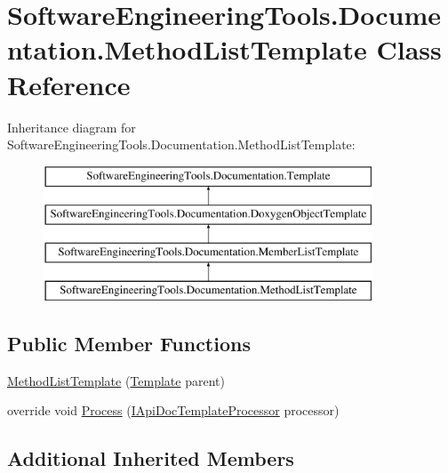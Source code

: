 \hypertarget{class_software_engineering_tools_1_1_documentation_1_1_method_list_template}{\section{Software\+Engineering\+Tools.\+Documentation.\+Method\+List\+Template Class Reference}
\label{class_software_engineering_tools_1_1_documentation_1_1_method_list_template}
}
Inheritance diagram for Software\+Engineering\+Tools.\+Documentation.\+Method\+List\+Template\+:\begin{figure}[H]
\begin{center}
\leavevmode
\includegraphics[height=4.000000cm]{class_software_engineering_tools_1_1_documentation_1_1_method_list_template}
\end{center}
\end{figure}
\subsection*{Public Member Functions}
\begin{DoxyCompactItemize}
\item 
\hyperlink{class_software_engineering_tools_1_1_documentation_1_1_method_list_template_aa206483174965cab43e383e89c8e76f3}{Method\+List\+Template} (\hyperlink{class_software_engineering_tools_1_1_documentation_1_1_template}{Template} parent)
\item 
override void \hyperlink{class_software_engineering_tools_1_1_documentation_1_1_method_list_template_a504360f3018407ed36305b61013b7b04}{Process} (\hyperlink{interface_software_engineering_tools_1_1_documentation_1_1_i_api_doc_template_processor}{I\+Api\+Doc\+Template\+Processor} processor)
\end{DoxyCompactItemize}
\subsection*{Additional Inherited Members}


